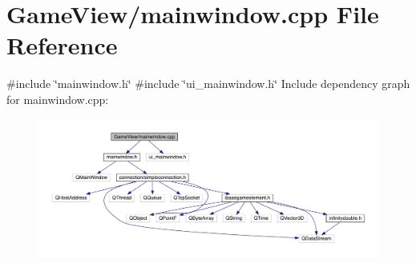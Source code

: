 \hypertarget{a00080}{}\section{Game\+View/mainwindow.cpp File Reference}
\label{a00080}
{\ttfamily \#include \char`\"{}mainwindow.\+h\char`\"{}}\newline
{\ttfamily \#include \char`\"{}ui\+\_\+mainwindow.\+h\char`\"{}}\newline
Include dependency graph for mainwindow.\+cpp\+:
\nopagebreak
\begin{figure}[H]
\begin{center}
\leavevmode
\includegraphics[width=350pt]{d8/d53/a00081}
\end{center}
\end{figure}

